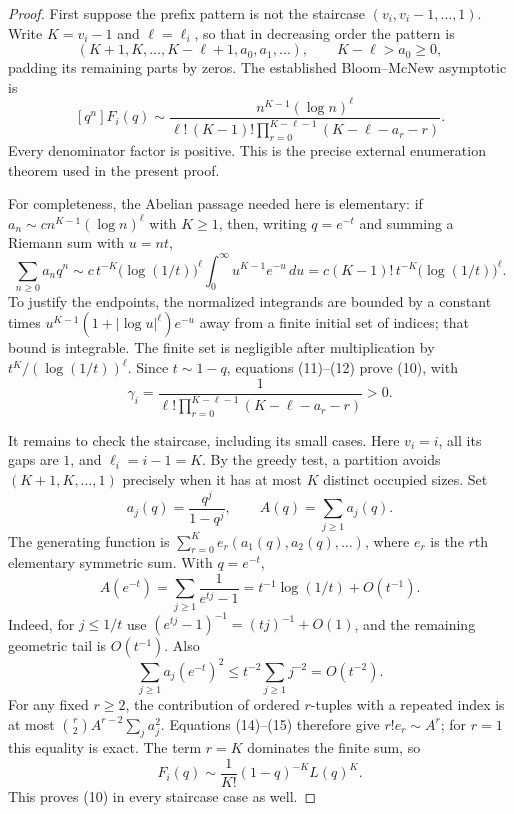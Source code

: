 \documentclass[11pt,a4paper]{article}
\numberwithin{equation}{section}
\theoremstyle{definition}
\theoremstyle{remark}
\begin{document}
\begin{proof}
First suppose the prefix pattern is not the staircase
$(v_i,v_i-1,\ldots,1)$.  Write $K=v_i-1$ and $\ell=\ell_i$,
so that in decreasing order the pattern is
\[
 (K+1,K,\ldots,K-\ell+1,a_0,a_1,\ldots),\qquad
 K-\ell>a_0\ge0,
\]
padding its remaining parts by zeros.  The established
Bloom--McNew asymptotic \cite[Theorem 4.16]{add47taisho:r47:BM} is
\[
 [q^n]F_i(q)\sim
 \frac{n^{K-1}(\log n)^\ell}
 {\ell!\,(K-1)!\displaystyle\prod_{r=0}^{K-\ell-1}
                      (K-\ell-a_r-r)}.              \tag{11}
\]
Every denominator factor is positive.  This is the precise external
enumeration theorem used in the present proof.

For completeness, the Abelian passage needed here is elementary:
if $a_n\sim c n^{K-1}(\log n)^\ell$ with $K\ge1$, then, writing
$q=e^{-t}$ and summing a Riemann sum with $u=nt$,
\[
 \sum_{n\ge0}a_nq^n\sim
 c\,t^{-K}\bigl(\log(1/t)\bigr)^\ell
 \int_0^\infty u^{K-1}e^{-u}\,du
 =c(K-1)!\,t^{-K}\bigl(\log(1/t)\bigr)^\ell.        \tag{12}
\]
To justify the endpoints, the normalized integrands are bounded by a
constant times $u^{K-1}(1+|\log u|^\ell)e^{-u}$ away from a finite
initial set of indices; that bound is integrable.  The finite set is
negligible after multiplication by $t^K/(\log(1/t))^\ell$.
Since $t\sim1-q$, equations (11)--(12) prove (10), with
\[
 \gamma_i=
 \frac{1}{\ell!\displaystyle\prod_{r=0}^{K-\ell-1}
                       (K-\ell-a_r-r)}>0.            \tag{13}
\]

It remains to check the staircase, including its small cases.
Here $v_i=i$, all its gaps are $1$, and $\ell_i=i-1=K$.
By the greedy test, a partition avoids $(K+1,K,\ldots,1)$ precisely
when it has at most $K$ distinct occupied sizes.  Set
\[
 a_j(q)=\frac{q^j}{1-q^j},\qquad A(q)=\sum_{j\ge1}a_j(q).
\]
The generating function is
$\sum_{r=0}^K e_r(a_1(q),a_2(q),\ldots)$, where $e_r$ is the
$r$th elementary symmetric sum.  With $q=e^{-t}$,
\[
 A(e^{-t})=\sum_{j\ge1}\frac1{e^{tj}-1}
       =t^{-1}\log(1/t)+O(t^{-1}).                  \tag{14}
\]
Indeed, for $j\le1/t$ use $(e^{tj}-1)^{-1}=(tj)^{-1}+O(1)$,
and the remaining geometric tail is $O(t^{-1})$.
Also
\[
 \sum_{j\ge1}a_j(e^{-t})^2\le t^{-2}\sum_{j\ge1}j^{-2}
       =O(t^{-2}).                                  \tag{15}
\]
For any fixed $r\ge2$, the contribution of ordered $r$-tuples with a
repeated index is at most
$\binom r2 A^{r-2}\sum_j a_j^2$.  Equations (14)--(15) therefore give
$r!e_r\sim A^r$; for $r=1$ this equality is exact.
The term $r=K$ dominates the finite sum, so
\[
 F_i(q)\sim\frac1{K!}(1-q)^{-K}L(q)^K.
\]
This proves (10) in every staircase case as well.
\end{proof}
\end{document}

